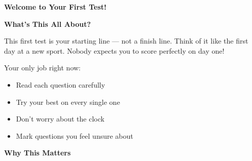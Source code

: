 \clearpage
\thispagestyle{empty}
{\sffamily

\begin{center}
{\fontsize{22}{26}\selectfont\bfseries\color{funBlue} \faFlag\hspace{3mm}Welcome to Your First Test!\hspace{3mm}\faFlag}

\vspace{2mm}
{\color{funGray}\hrulefill}
\end{center}

\vspace{3mm}

\begin{tcolorbox}[
    enhanced,
    colback=funBlueLight,
    colframe=funBlue!50,
    arc=10pt,
    boxrule=1.5pt,
    left=6mm, right=6mm, top=5mm, bottom=5mm,
]
{\large\bfseries\color{funBlueDark} \faCompass\hspace{2mm}What's This All About?}

\vspace{2mm}

This first test is your starting line — not a finish line. Think of it like the first day at a new sport. Nobody expects you to score perfectly on day one!

\vspace{2mm}

Your only job right now:
\begin{itemize}[leftmargin=6mm, itemsep=3pt]
    \item[\textcolor{funBlue}{\faCheck}] Read each question carefully
    \item[\textcolor{funBlue}{\faCheck}] Try your best on every single one
    \item[\textcolor{funBlue}{\faCheck}] Don't worry about the clock
    \item[\textcolor{funBlue}{\faCheck}] Mark questions you feel unsure about
\end{itemize}
\end{tcolorbox}

\vspace{3mm}

\begin{tcolorbox}[
    enhanced,
    colback=funYellowLight,
    colframe=funYellow!60,
    arc=10pt,
    boxrule=1pt,
    left=6mm, right=6mm, top=4mm, bottom=4mm,
]
{\bfseries\color{funYellowDark} \faLightbulb\hspace{2mm}Why This Matters}


\end{tcolorbox}}
